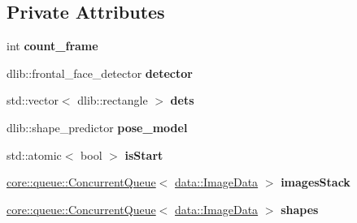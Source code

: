 \subsection*{Private Attributes}
\begin{DoxyCompactItemize}
\item 
\mbox{\label{classfilter_1_1algos_1_1_face_landmark_a77081eb7fa985cbf60c16189c55a3bbd}} 
int {\bfseries count\+\_\+frame}
\item 
\mbox{\label{classfilter_1_1algos_1_1_face_landmark_a1a04ccd050f78322da687211f3f96097}} 
dlib\+::frontal\+\_\+face\+\_\+detector {\bfseries detector}
\item 
\mbox{\label{classfilter_1_1algos_1_1_face_landmark_a69287e3b5462a96e991a222d3ff328e3}} 
std\+::vector$<$ dlib\+::rectangle $>$ {\bfseries dets}
\item 
\mbox{\label{classfilter_1_1algos_1_1_face_landmark_a2d9af3baf74a483045047667a2260d0b}} 
dlib\+::shape\+\_\+predictor {\bfseries pose\+\_\+model}
\item 
\mbox{\label{classfilter_1_1algos_1_1_face_landmark_a74a80b682e53b82946844575bf9c8d2f}} 
std\+::atomic$<$ bool $>$ {\bfseries is\+Start}
\item 
\mbox{\label{classfilter_1_1algos_1_1_face_landmark_a7b114dda5095aa783b1bf165a6d3fc4d}} 
\hyperlink{classcore_1_1queue_1_1_concurrent_queue}{core\+::queue\+::\+Concurrent\+Queue}$<$ \hyperlink{classfilter_1_1data_1_1_image_data}{data\+::\+Image\+Data} $>$ {\bfseries images\+Stack}
\item 
\mbox{\label{classfilter_1_1algos_1_1_face_landmark_acd6ae34d87edf76630b9641753ab6859}} 
\hyperlink{classcore_1_1queue_1_1_concurrent_queue}{core\+::queue\+::\+Concurrent\+Queue}$<$ \hyperlink{classfilter_1_1data_1_1_image_data}{data\+::\+Image\+Data} $>$ {\bfseries shapes}
\item 
\mbox{\label{classfilter_1_1algos_1_1_face_landmark_a94727dd37708c46475d62eecb236622c}} 

\end{DoxyCompactItemize}
